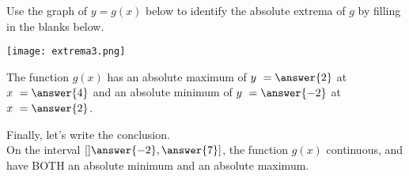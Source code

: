 \documentclass{ximera}
\begin{document}
\begin{exercise}
Use the graph of $y = g(x)$ below to identify the absolute extrema of $g$ by filling in the blanks below. 

\begin{center} \texttt{[image: extrema3.png]} \end{center}

The function $g(x)$ has an absolute maximum of $y \ = \answer{2}$ at $x \ = \answer{4}$ and an absolute minimum of $y \ = \answer{-2}$ at $x \ = \answer{2}$.

\begin{exercise}
Finally, let's write the conclusion.  \\

On the  interval $[] \answer{-2}, \answer{7}]$, the function $g(x)$  continuous, and  have BOTH an absolute minimum and an absolute maximum. 
\end{exercise}
\end{exercise}
\end{document}
